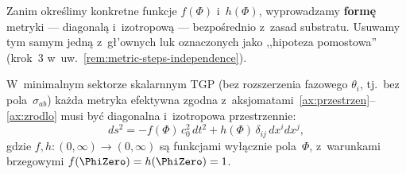 Zanim okre\'slimy konkretne funkcje $f(\Phi)$ i~$h(\Phi)$,
wyprowadzamy \textbf{form\k{e}} metryki --- diagonal\k{a} i~izotropow\k{a}
--- bezpo\'srednio z~zasad substratu.
Usuwamy tym samym jedn\k{a} z~g\l{}'ownych luk oznaczonych
jako ,,hipoteza pomostowa'' (krok~3 w~uw.~\ref{rem:metric-steps-independence}).

\begin{theorem}%
\label{thm:metric-form-uniqueness}
W~minimalnym sektorze skalarnnym TGP (bez rozszerzenia fazowego
$\theta_i$, tj.\ bez pola~$\sigma_{ab}$) ka\.zda metryka efektywna
zgodna z~aksjomatami~\ref{ax:przestrzen}--\ref{ax:zrodlo}
musi by\'c diagonalna i~izotropowa przestrzennie:
\begin{equation}\label{eq:metric-diagonal-form}
  ds^2 = -f(\Phi)\,c_0^2\,dt^2
         + h(\Phi)\,\delta_{ij}\,dx^i dx^j,
\end{equation}
gdzie $f, h : (0,\infty) \to (0,\infty)$ s\k{a} funkcjami wy\l{}\k{a}cznie
pola~$\Phi$, z~warunkami brzegowymi $f(\PhiZero) = h(\PhiZero) = 1$.
\end{theorem}


